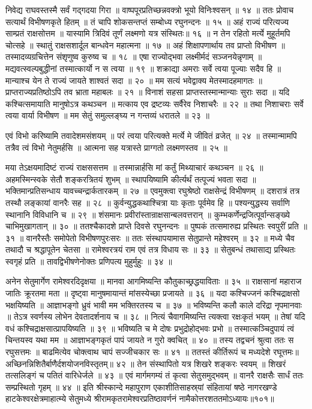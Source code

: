 निवेद्य राघवस्तस्मै सर्वं गद्गदया गिरा ॥
वाष्पपूरप्रतिच्छन्नवक्त्रो भूयो विनिःश्वसन् ॥ १४ ॥
ततः प्रोवाच सत्यार्थं विभीषणकृते हितम् ॥
तं चापि शोकसन्तप्तं सम्बोध्य रघुनन्दनः ॥ १५ ॥
अहं राज्यं परित्यज्य साम्प्रतं राक्षसोत्तम ॥
यास्यामि त्रिदिवं तूर्णं लक्ष्मणो यत्र संस्थितः॥ १६ ॥
न तेन रहितो मर्त्ये मुहूर्तमपि चोत्सहे ॥
स्थातुं राक्षसशार्दूल बान्धवेन महात्मना ॥ १७ ॥
अहं शिक्षापणार्थाय तव प्राप्तो विभीषण ॥
तस्मादव्यग्रचित्तेन संशृणुष्व कुरुष्व च ॥ १८ ॥
एषा राज्योद्भवा लक्ष्मीर्मदं सञ्जनयेन्नृणाम् ॥
मद्यवत्स्वल्पबुद्धीनां तस्मात्कार्यो न स त्वया ॥ १९ ॥
शक्राद्या अमराः सर्वे त्वया पूज्याः सदैव हि ॥
मान्याश्च येन ते राज्यं जायते शाश्वतं सदा ॥ २० ॥
मम सत्यं भवेद्वाक्य मेतस्मादहमागतः ॥
प्राप्तराज्यप्रतिष्ठोऽपि तव भ्राता महाबलः ॥ २१ ॥
विनाशं सहसा प्राप्तस्तस्मान्मान्याः सुराः सदा ॥
यदि कश्चित्समायाति मानुषोऽत्र कथञ्चन ॥
मत्काय एव द्रष्टव्यः सर्वैरेव निशाचरैः ॥ २२ ॥
तथा निशाचराः सर्वे त्वया वार्या विभीषण ॥
मम सेतुं समुल्लङ्घ्य न गन्तव्यं धरातले ॥ २३ ॥

एवं विभो करिष्यामि तवादेशमसंशयम् ॥
परं त्वया परित्यक्ते मर्त्ये मे जीवितं व्रजेत् ॥ २४ ॥
तस्मान्मामपि तत्रैव त्वं विभो नेतुमर्हसि ॥
आत्मना सह यत्रास्ते प्राग्गतो लक्ष्मणस्तव ॥ २५ ॥

मया तेऽक्षयमादिष्टं राज्यं राक्षससत्तम ॥
तस्मान्नार्हसि मां कर्तुं मिथ्याचारं कथञ्चन ॥ २६ ॥
अहमस्मिन्स्वके सेतौ शङ्करत्रितयं शुभम् ॥
स्थापयिष्यामि कीर्त्यर्थं तत्पूज्यं भवता सदा ॥
भक्तिमान्प्रतिसन्धाय यावच्चन्द्रार्कतारकम् ॥ २७ ॥
एवमुक्त्वा रघुश्रेष्ठो राक्षसेन्द्रं विभीषणम् ॥
दशरात्रं तत्र तस्थौ लङ्कायां वानरैः सह ॥ २८ ॥
कुर्वन्युद्धकथाश्चित्रा याः कृताः पूर्वमेव हि ॥
पश्यन्युद्धस्य सर्वाणि स्थानानि विविधानि च ॥ २९ ॥
शंसमानः प्रवीरांस्तान्राक्षसान्बलवत्तरान् ॥
कुम्भकर्णेन्द्रजित्पूर्वान्सङ्ख्ये चाभिमुखागतान् ॥ ३० ॥
ततश्चैकादशे प्राप्ते दिवसे रघुनन्दनः ॥
पुष्पकं तत्समारुह्य प्रस्थितः स्वपुरीं प्रति ॥ ३१ ॥
वानरैस्तैः समोपेतो विभीषणपुरःसरः ॥
ततः संस्थापयामास सेतुप्रान्ते महेश्वरम् ॥ ३२ ॥
मध्ये चैव तथादौ च श्रद्धापूतेन चेतसा ॥
रामेश्वरत्रयं राम एवं तत्र विधाय सः ॥ ३३ ॥
सेतुबन्धं तथासाद्य प्रस्थितः स्वगृहं प्रति ॥
तावद्विभीषणेनोक्तः प्रणिपत्य मुहुर्मुहुः ॥ ३४ ॥

अनेन सेतुमार्गेण रामेश्वरदिदृक्षया ॥
मानवा आगमिष्यन्ति कौतुकाच्छ्रद्धयाविताः ॥ ३५ ॥
राक्षसानां महाराज जातिः क्रूरतमा मता ॥
दृष्ट्वा मानुषमायान्तं मांसस्येच्छा प्रजायते ॥ ३६ ॥
यदा कश्चिज्जनं कश्चिद्राक्षसो भक्षयिष्यति ॥
आज्ञाभङ्गो ध्रुवं भावी मम भक्तिरतस्य च ॥ ३७ ॥
भविष्यन्ति कलौ काले दरिद्रा नृपमानवाः ॥
तेऽत्र स्वर्णस्य लोभेन देवतादर्शनाय च ॥ ३८ ॥
नित्यं चैवागमिष्यन्ति त्यक्त्वा रक्षःकृतं भयम् ॥
तेषां यदि वधं कश्चिद्राक्षसात्प्रापयिष्यति ॥ ३९ ॥
भविष्यति च मे दोषः प्रभुद्रोहोद्भवः प्रभो ॥
तस्मात्कञ्चिदुपायं त्वं चिन्तयस्व यथा मम ॥
आज्ञाभङ्गकृतं पापं जायते न गुरो क्वचित् ॥ ४० ॥
तस्य तद्वचनं श्रुत्वा ततः स रघुसत्तमः ॥
बाढमित्येव चोक्त्वाथ चापं सज्जीचकार सः ॥ ४१ ॥
ततस्तं कीर्तिरूपं च मध्यदेशे रघूत्तमः॥
अच्छिनन्निशितैर्बाणैर्दशयोजनविस्तृतम्॥ ४२ ॥
तेन संस्थापितो यत्र शिखरे शङ्करः स्वयम् ॥
शिखरं तत्सलिङ्गं च पतितं वारिधेर्जले ॥ ४३ ॥
एवं मार्गमगम्यं तं कृत्वा सेतुसमुद्भवम् ॥
वानरै राक्षसैः सार्धं ततः सम्प्रस्थितो गृहम् ॥ ४४ ॥
इति श्रीस्कान्दे महापुराण एकाशीतिसाहस्र्यां संहितायां षष्ठे नागरखण्डे हाटकेश्वरक्षेत्रमाहात्म्ये सेतुमध्ये श्रीरामकृतरामेश्वरप्रतिष्ठावर्णनं नामैकोत्तरशततमोऽध्यायः॥१०१॥

